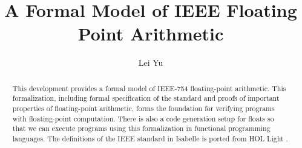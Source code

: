 \documentclass[11pt,a4paper]{article}
\begin{document}
\title{A Formal Model of IEEE Floating Point Arithmetic}
\author{Lei Yu}
\maketitle

\begin{abstract}
  This development provides a formal model of IEEE-754 floating-point
  arithmetic. This formalization, including formal specification of the
  standard and proofs of important properties of floating-point arithmetic,
  forms the foundation for verifying programs with floating-point computation.
  There is also a code generation setup for floats so that we can execute
  programs using this formalization in functional programming languages. The
  definitions of the IEEE standard in Isabelle is ported from HOL Light
  \cite{harrison1997floating}.
\end{abstract}

\tableofcontents





\end{document}
